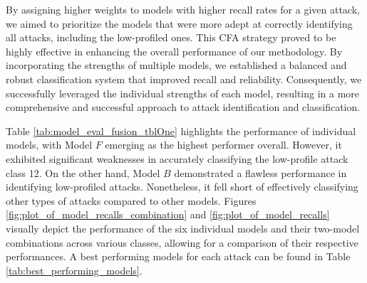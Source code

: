 \begin{comment}
$8$ && 1 & 1 &  1 & 1  & 0.666667 & 1 & 1        & 1        &  0.666667 & 1        & 1        & 1   & 1        & 1   & 0.666667        & 1   \\
$9$ && 0.999421 & 0.99995 & 0.999472 & 0.999673  & 0.999497 & 0.999849 & 0.999673 & 0.99995  & 0.999472 & 0.999924 & 0.999522 & 0.999924 & 0.999597 & 0.999924 & 0.999472        & 0.999924 \\
$10$ &&  0.990528 & 0.990528 & 0.985195 & 0.990528  & 0.993252 & 0.99594  & 0.998645 & 0.997294 & 0.997286 & 0.994587 & 0.990566 & 0.994587 & 0.998643 & 0.99594 & 0.997286        & 0.994587 \\
$11$ && 0.859155 & 0.358824 & 0.700767 & 0.805882  & 0.659229 & 0.955882  & 0.716495 & 0.817647 &  0.70437  & 0.805882 & 0.713198 & 0.826471 & 0.708955 & 0.838235 & 0.710145        & 0.144118\\
$12$ &&  0.04918 & 1 & 0 & 0  & 0        & 0  & 0      & 0        &  0        & 0        & 0      & 0 & 0.666667     & 0.666667  & 0.04918         & 1      \\
$13$ && 0.389646 & 0.877301 & 0.452991 & 0.325153  & 0.44     & 0.067485  & 0.462264 & 0.300613 &  0.444444 & 0.319018 & 0.46789  & 0.312883 & 0.470588  & 0.294479 & 0.328421        & 0.957055 \\
\hline
\end{tabular}
\end{adjustbox}
\end{table*}

\end{comment}

By assigning higher weights to models with higher recall rates for a given attack, we aimed to prioritize the models that were more adept at correctly identifying all attacks, including the low-profiled ones. This CFA strategy proved to be highly effective in enhancing the overall performance of our methodology. By incorporating the strengths of multiple models, we established a balanced and robust classification system that improved recall and reliability. Consequently, we successfully leveraged the individual strengths of each model, resulting in a more comprehensive and successful approach to attack identification and classification.

Table \ref{tab:model_eval_fusion_tblOne} highlights the performance of individual models, with Model $F$ emerging as the highest performer overall. However, it exhibited significant weaknesses in accurately classifying the low-profile attack class 12. On the other hand, Model $B$ demonstrated a flawless performance in identifying low-profiled attacks. Nonetheless, it fell short of effectively classifying other types of attacks compared to other models. Figures \ref{fig:plot_of_model_recalls_combination} and \ref{fig:plot_of_model_recalls} visually depict the performance of the six individual models and their two-model combinations across various classes, allowing for a comparison of their respective performances. A best performing models for each attack can be found in Table \ref{tab:best_performing_models}.

